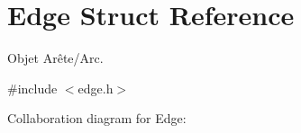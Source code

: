 \hypertarget{struct_edge}{}\section{Edge Struct Reference}
\label{struct_edge}


Objet Arête/\+Arc.  




{\ttfamily \#include $<$edge.\+h$>$}



Collaboration diagram for Edge\+:
